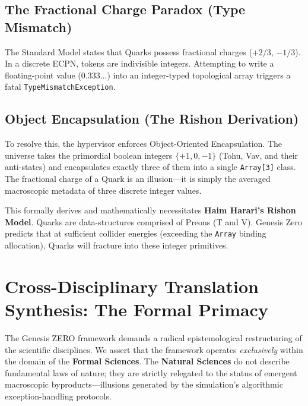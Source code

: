 \documentclass[11pt, a4paper]{article}
\begin{document}
\subsection{The Fractional Charge Paradox (Type Mismatch)}
The Standard Model states that Quarks possess fractional charges ($+2/3$, $-1/3$). In a discrete ECPN, tokens are indivisible integers. Attempting to write a floating-point value ($0.333\dots$) into an integer-typed topological array triggers a fatal \texttt{TypeMismatchException}. 

\subsection{Object Encapsulation (The Rishon Derivation)}
To resolve this, the hypervisor enforces Object-Oriented Encapsulation. The universe takes the primordial boolean integers $\{+1, 0, -1\}$ (Tohu, Vav, and their anti-states) and encapsulates exactly three of them into a single \texttt{Array[3]} class. 
The fractional charge of a Quark is an illusion---it is simply the averaged macroscopic metadata of three discrete integer values. 

This formally derives and mathematically necessitates \textbf{Haim Harari's Rishon Model}. Quarks are data-structures comprised of Preons (T and V). Genesis Zero predicts that at sufficient collider energies (exceeding the \texttt{Array} binding allocation), Quarks will fracture into these integer primitives.

\section{Cross-Disciplinary Translation Synthesis: The Formal Primacy}
The Genesis ZERO framework demands a radical epistemological restructuring of the scientific disciplines. We assert that the framework operates \textit{exclusively} within the domain of the \textbf{Formal Sciences}. The \textbf{Natural Sciences} do not describe fundamental laws of nature; they are strictly relegated to the status of emergent macroscopic byproducts---illusions generated by the simulation's algorithmic exception-handling protocols.
\end{document}
